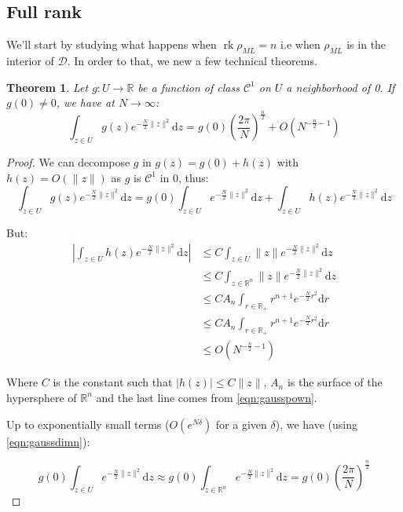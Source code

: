 \documentclass[10pt,a4paper]{report}
\theoremstyle{plain}
\newtheorem{thm}{Theorem}[chapter]
\theoremstyle{definition}
\theoremstyle{remark}
\newcommand{\R}{\ensuremath{\mathbb{R}}}
\newcommand{\dd}{\mathrm{d}}
\renewcommand{\leq}{\leqslant}
\DeclareMathOperator{\rk}{rk}
\newcommand{\class}[1]{{\mathscr{C}^{#1}}}
\newcommand{\ml}{_{M\!L}}
\begin{document}
\subsection{Full rank}

We'll start by studying what happens when $\rk \rho\ml = n$ i.e when $\rho\ml$
is in the interior of $\mathcal{D}$. In order to that, we new a few technical theorems.

\begin{thm}\label{thm:asy1}
  Let $g : U \to \R$ be a function of class $\class 1$ on $U$ a neighborhood of 0. If $g(0)
  \neq 0$, we have at $N \to \infty$:
  \[\int_{z \in U} g(z)e^{-\frac N2\|z\|^2} \dd z = g(0){\left(\frac
      {2\pi}{N}\right)}^{\frac n 2} +
    O\left({N^{-\frac n 2 -1}}\right)\]
\end{thm}

\begin{proof}

  We can decompose $g$ in $g(z) = g(0) + h(z)$ with $h(z) = O(\|z\|)$ as $g$ is
  $\class{1}$ in 0, thus:
\[\int_{z \in U} g(z)e^{-\frac N2\|z\|^2} \dd z = g(0)\int_{z \in U} e^{-\frac
    N2\|z\|^2} \dd z + \int_{z \in U} h(z)e^{-\frac N2\|z\|^2} \dd z\]

But:
\begin{align*}
  \left |\int_{z \in U} h(z)e^{-\frac N2\|z\|^2} \dd z\right|
  &\leq C \int_{z \in U} \|z\|e^{-\frac N2\|z\|^2} \dd z\\
  &\leq C \int_{z \in \R^n} \|z\|e^{-\frac N2\|z\|^2} \dd z\\
  &\leq CA_n \int_{r \in \R_+} r^{n+1}e^{-\frac N2 r^2} \dd r\\
  &\leq CA_n \int_{r \in \R_+} r^{n+1}e^{-\frac N2 r^2} \dd r\\
  &\leq O\left({N^{-\frac n 2 -1}}\right)
\end{align*}

Where $C$ is the constant such that $|h(z)| \leq C \|z\|$, $A_n$ is the surface
of the hypersphere of $\R^n$ and the last line comes from \cref{eqn:gausspown}.

Up to exponentially small terms ($O(e^{N\delta})$ for a given $\delta$), we have
(using \cref{eqn:gaussdimn}):

\[g(0)\int_{z \in U} e^{-\frac
    N2\|z\|^2} \dd z \approx g(0)\int_{z \in \R^n} e^{-\frac
    N2\|z\|^2} \dd z = g(0) {\left(\frac
      {2\pi}{N}\right)}^{\frac n 2}\]

\end{proof}

\
\end{document}
